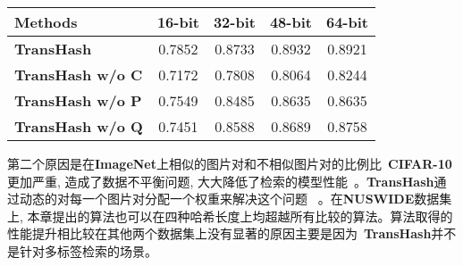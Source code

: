 \begin{table}[!htpb]
\begin{tabular}{cccccc}
    \multicolumn{2}{l|}{Methods} & 16-bit & 32-bit & 48-bit & 64-bit   \\\hline
    \hline
    \multicolumn{2}{l|}{\textbf{TransHash}} & 0.7852 & 0.8733 & 0.8932 & 0.8921  \\
    \multicolumn{2}{l|}{\textbf{TransHash w/o C}} & 0.7172 & 0.7808 & 0.8064 & 0.8244  \\
    \multicolumn{2}{l|}{\textbf{TransHash w/o P}} & 0.7549 & 0.8485 & 0.8635 & 0.8635  \\
    \multicolumn{2}{l|}{\textbf{TransHash w/o Q}} & 0.7451 & 0.8588 & 0.8689 & 0.8758  \\
    \hline
    \hline 
    \end{tabular}
    \label{table:ablation}
  \end{table}





第二个原因是在\textbf{ImageNet}上相似的图片对和不相似图片对的比例比~\textbf{CIFAR-10}更加严重, 造成了数据不平衡问题, 大大降低了检索的模型性能~\cite{zhang2019improved,liu2016deep12}。\textbf{TransHash}通过动态的对每一个图片对分配一个权重来解决这个问题~ \cite{cao2017hashnet}。在\textbf{NUSWIDE}数据集上, 本章提出的算法也可以在四种哈希长度上均超越所有比较的算法。算法取得的性能提升相比较在其他两个数据集上没有显著的原因主要是因为~\textbf{TransHash}并不是针对多标签检索的场景。\par


